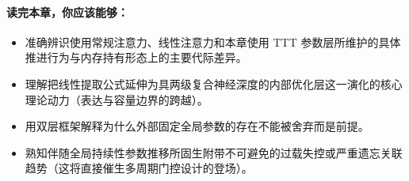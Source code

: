 \paragraph{读完本章，你应该能够：}
\begin{itemize}
    \item 准确辨识使用常规注意力、线性注意力和本章使用 TTT 参数层所维护的具体推进行为与内存持有形态上的主要代际差异。
    \item 理解把线性提取公式延伸为具两级复合神经深度的内部优化层这一演化的核心理论动力（表达与容量边界的跨越）。
    \item 用双层框架解释为什么外部固定全局参数的存在不能被舍弃而是前提。
    \item 熟知伴随全局持续性参数推移所固生附带不可避免的过载失控或严重遗忘关联趋势（这将直接催生多周期门控设计的登场）。
\end{itemize}

